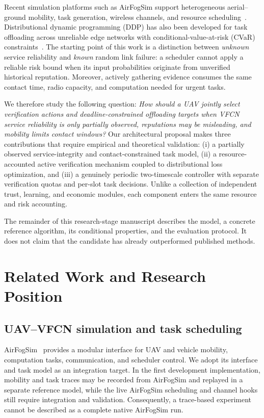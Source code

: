 \documentclass[journal]{IEEEtran}
\begin{document}
Recent simulation platforms such as AirFogSim support heterogeneous aerial--ground mobility, task generation, wireless channels, and resource scheduling~\cite{wei2026airfogsim}. Distributional dynamic programming (DDP) has also been developed for task offloading across unreliable edge networks with conditional-value-at-risk (CVaR) constraints~\cite{lin2026ddp}. The starting point of this work is a distinction between \emph{unknown} service reliability and \emph{known} random link failure: a scheduler cannot apply a reliable risk bound when its input probabilities originate from unverified historical reputation. Moreover, actively gathering evidence consumes the same contact time, radio capacity, and computation needed for urgent tasks.

We therefore study the following question: \emph{How should a UAV jointly select verification actions and deadline-constrained offloading targets when VFCN service reliability is only partially observed, reputations may be misleading, and mobility limits contact windows?} Our architectural proposal makes three contributions that require empirical and theoretical validation: (i) a partially observed service-integrity and contact-constrained task model, (ii) a resource-accounted active verification mechanism coupled to distributional loss optimization, and (iii) a genuinely periodic two-timescale controller with separate verification quotas and per-slot task decisions. Unlike a collection of independent trust, learning, and economic modules, each component enters the same resource and risk accounting.

The remainder of this research-stage manuscript describes the model, a concrete reference algorithm, its conditional properties, and the evaluation protocol. It does not claim that the candidate has already outperformed published methods.

\section{Related Work and Research Position}
\subsection{UAV--VFCN simulation and task scheduling}
AirFogSim~\cite{wei2026airfogsim} provides a modular interface for UAV and vehicle mobility, computation tasks, communication, and scheduler control. We adopt its interface and task model as an integration target. In the first development implementation, mobility and task traces may be recorded from AirFogSim and replayed in a separate reference model, while the live AirFogSim scheduling and channel hooks still require integration and validation. Consequently, a trace-based experiment cannot be described as a complete native AirFogSim run.
\end{document}
